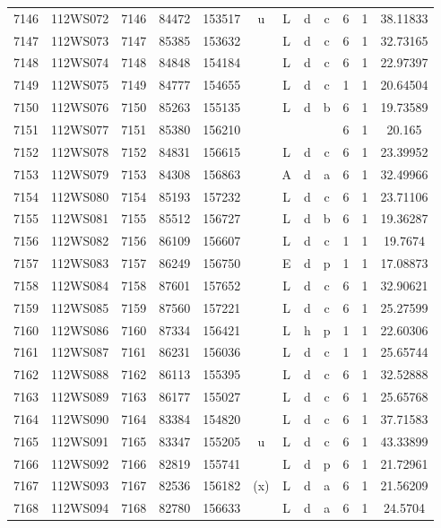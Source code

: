 \begin{tabular}{|*{12}{c|}}
7146 & 112WS072 & 7146 & 84472 & 153517 & u & L & d & c & 6 & 1 & 38.11833 \\ 
7147 & 112WS073 & 7147 & 85385 & 153632 &  & L & d & c & 6 & 1 & 32.73165 \\ 
7148 & 112WS074 & 7148 & 84848 & 154184 &  & L & d & c & 6 & 1 & 22.97397 \\ 
7149 & 112WS075 & 7149 & 84777 & 154655 &  & L & d & c & 1 & 1 & 20.64504 \\ 
7150 & 112WS076 & 7150 & 85263 & 155135 &  & L & d & b & 6 & 1 & 19.73589 \\ 
7151 & 112WS077 & 7151 & 85380 & 156210 &  &  &  &  & 6 & 1 & 20.165 \\ 
7152 & 112WS078 & 7152 & 84831 & 156615 &  & L & d & c & 6 & 1 & 23.39952 \\ 
7153 & 112WS079 & 7153 & 84308 & 156863 &  & A & d & a & 6 & 1 & 32.49966 \\ 
7154 & 112WS080 & 7154 & 85193 & 157232 &  & L & d & c & 6 & 1 & 23.71106 \\ 
7155 & 112WS081 & 7155 & 85512 & 156727 &  & L & d & b & 6 & 1 & 19.36287 \\ 
7156 & 112WS082 & 7156 & 86109 & 156607 &  & L & d & c & 1 & 1 & 19.7674 \\ 
7157 & 112WS083 & 7157 & 86249 & 156750 &  & E & d & p & 1 & 1 & 17.08873 \\ 
7158 & 112WS084 & 7158 & 87601 & 157652 &  & L & d & c & 6 & 1 & 32.90621 \\ 
7159 & 112WS085 & 7159 & 87560 & 157221 &  & L & d & c & 6 & 1 & 25.27599 \\ 
7160 & 112WS086 & 7160 & 87334 & 156421 &  & L & h & p & 1 & 1 & 22.60306 \\ 
7161 & 112WS087 & 7161 & 86231 & 156036 &  & L & d & c & 1 & 1 & 25.65744 \\ 
7162 & 112WS088 & 7162 & 86113 & 155395 &  & L & d & c & 6 & 1 & 32.52888 \\ 
7163 & 112WS089 & 7163 & 86177 & 155027 &  & L & d & c & 6 & 1 & 25.65768 \\ 
7164 & 112WS090 & 7164 & 83384 & 154820 &  & L & d & c & 6 & 1 & 37.71583 \\ 
7165 & 112WS091 & 7165 & 83347 & 155205 & u & L & d & c & 6 & 1 & 43.33899 \\ 
7166 & 112WS092 & 7166 & 82819 & 155741 &  & L & d & p & 6 & 1 & 21.72961 \\ 
7167 & 112WS093 & 7167 & 82536 & 156182 & (x) & L & d & a & 6 & 1 & 21.56209 \\ 
7168 & 112WS094 & 7168 & 82780 & 156633 &  & L & d & a & 6 & 1 & 24.5704 \\ 

\end{tabular}
